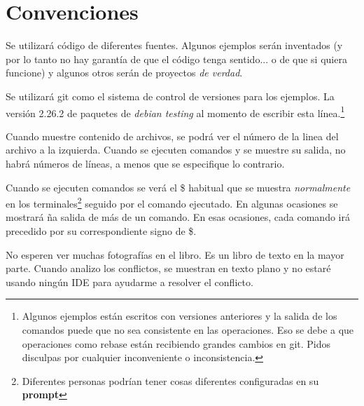 
\section{Convenciones}

Se utilizará código de diferentes fuentes. Algunos ejemplos serán inventados (y por lo tanto no hay garantía de que
el código tenga sentido... o de que si quiera funcione) y algunos otros serán de proyectos {\it de verdad}.

Se utilizará git como el sistema de control de versiones para los ejemplos. La versión 2.26.2 de paquetes de
{\it debian testing} al momento de escribir esta línea.\footnote{Algunos ejemplos están escritos con versiones anteriores
y la salida de los comandos puede que no sea consistente en las operaciones. Eso se debe a que operaciones como rebase están
recibiendo grandes cambios en git. Pidos disculpas por cualquier inconveniente o inconsistencia.}

Cuando muestre contenido de archivos, se podrá ver el número de la linea del archivo a la izquierda. Cuando se ejecuten comandos
y se muestre su salida, no habrá números de líneas, a menos que se especifique lo contrario.

Cuando se ejecuten comandos se verá el \$ habitual que se muestra {\it normalmente} en los terminales\footnote{ Diferentes personas
podrían tener cosas diferentes configuradas en su {\bf prompt}} seguido por el comando ejecutado. En algunas ocasiones se mostrará ña
salida de más de un comando. En esas ocasiones, cada comando irá precedido por su correspondiente signo de \$.

No esperen ver muchas fotografías en el libro. Es un libro de texto en la mayor parte. Cuando analizo los conflictos, se muestran
en texto plano y no estaré usando ningún IDE para ayudarme a resolver el conflicto.
